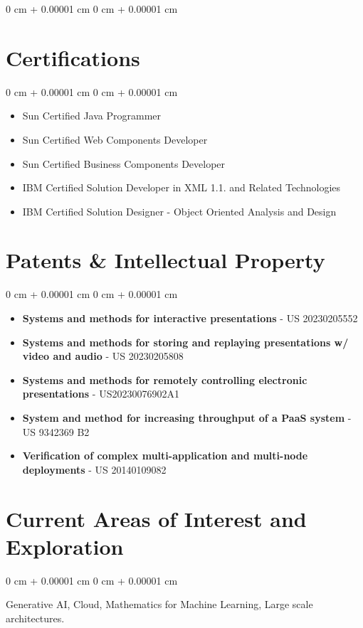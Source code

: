 \documentclass[10pt, letterpaper]{article}
\newenvironment{highlights}{
    \begin{itemize}[
        topsep=0.10 cm,
        parsep=0.10 cm,
        partopsep=0pt,
        itemsep=0pt,
        leftmargin=0 cm + 10pt
    ]
}{
    \end{itemize}
} %
\newenvironment{onecolentry}{
    \begin{adjustwidth}{
        0 cm + 0.00001 cm
    }{
        0 cm + 0.00001 cm
    }
}{
    \end{adjustwidth}
} %
\begin{document}
\begin{onecolentry}
\begin{highlights}
        \section{Certifications}
        \vspace{0.10 cm}
        \begin{onecolentry}
            \begin{highlights}
                \item Sun Certified Java Programmer
                \item Sun Certified Web Components Developer
                \item Sun Certified Business Components Developer
                \item IBM Certified Solution Developer in XML 1.1. and Related Technologies
                \item IBM Certified Solution Designer - Object Oriented Analysis and Design
            \end{highlights}
        \end{onecolentry}

        \section{Patents \& Intellectual Property}
        \vspace{0.10 cm}
        \begin{onecolentry}
            \begin{highlights}
                \item \textbf{Systems and methods for interactive presentations} - US 20230205552
                \item \textbf{Systems and methods for storing and replaying presentations w/ video and audio} - US 20230205808
                \item \textbf{Systems and methods for remotely controlling electronic presentations} - US20230076902A1
                \item \textbf{System and method for increasing throughput of a PaaS system} - US 9342369 B2
                \item \textbf{Verification of complex multi-application and multi-node deployments} - US 20140109082
            \end{highlights}
        \end{onecolentry}
        
        \section{Current Areas of Interest and Exploration}
        \vspace{0.10 cm}
        \begin{onecolentry}
            Generative AI, Cloud, Mathematics for Machine Learning, Large scale architectures.
        \end{onecolentry}
        

\end{highlights}
\end{onecolentry}
\end{document}
